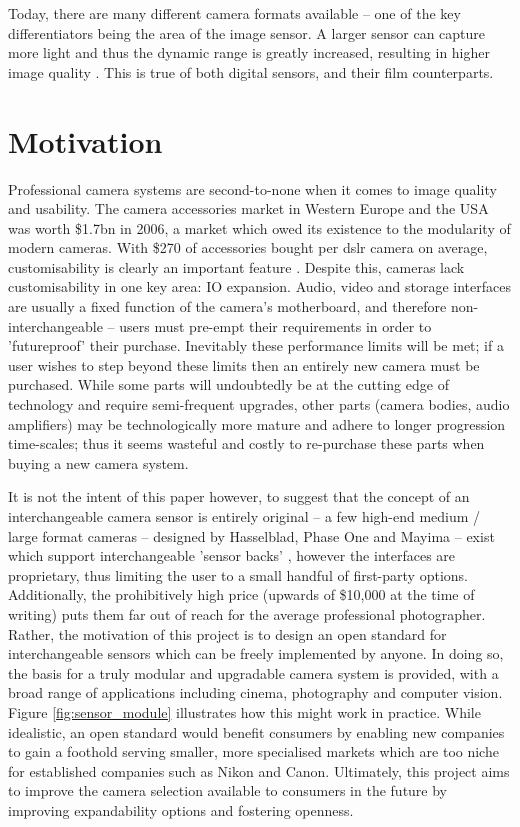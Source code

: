 \documentclass[a4paper]{report}
\begin{document}
Today, there are many different camera formats available -- one of the key differentiators being the area of the image sensor. A larger sensor can capture more light and thus the dynamic range is greatly increased, resulting in higher image quality \cite{8_chen_catrysse_el_gamal_wandell_2000}. This is true of both digital sensors, and their film counterparts.

\section{Motivation}

Professional camera systems are second-to-none when it comes to image quality and usability. The camera accessories market in Western Europe and the USA was worth \$1.7bn in 2006, a market which owed its existence to the modularity of modern cameras. With \$270 of accessories bought per \gls{dslr} camera on average, customisability is clearly an important feature \cite{9_understanding_and_solutions_2007}. Despite this, cameras lack customisability in one key area: IO expansion. Audio, video and storage interfaces are usually a fixed function of the camera's motherboard, and therefore non-interchangeable -- users must pre-empt their requirements in order to 'futureproof' their purchase. Inevitably these performance limits will be met; if a user wishes to step beyond these limits then an entirely new camera must be purchased. While some parts will undoubtedly be at the cutting edge of technology and require semi-frequent upgrades, other parts (camera bodies, audio amplifiers) may be technologically more mature and adhere to longer progression time-scales; thus it seems wasteful and costly to re-purchase these parts when buying a new camera system.

It is not the intent of this paper however, to suggest that the concept of an interchangeable camera sensor is entirely original -- a few high-end medium / large format cameras -- designed by Hasselblad, Phase One and Mayima -- exist which support interchangeable 'sensor backs' , however the interfaces are proprietary, thus limiting the user to a small handful of first-party options. Additionally, the prohibitively high price (upwards of \$10,000 at the time of writing) puts them far out of reach for the average professional photographer. Rather, the motivation of this project is to design an open standard for interchangeable sensors which can be freely implemented by anyone. In doing so, the basis for a truly modular and upgradable camera system is provided, with a broad range of applications including cinema, photography and computer vision. Figure \ref{fig:sensor_module} illustrates how this might work in practice. While idealistic, an open standard would benefit consumers by enabling new companies to gain a foothold serving smaller, more specialised markets which are too niche for established companies such as Nikon and Canon. Ultimately, this project aims to improve the camera selection available to consumers in the future by improving expandability options and fostering openness.
\end{document}
